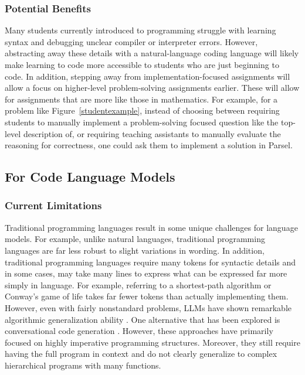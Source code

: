 \subsubsection{Potential Benefits}
Many students currently introduced to programming struggle with learning syntax and debugging unclear compiler or interpreter errors. However, abstracting away these details with a natural-language coding language will likely make learning to code more accessible to students who are just beginning to code. In addition, stepping away from implementation-focused assignments will allow a focus on higher-level problem-solving assignments earlier. These will allow for assignments that are more like those in mathematics. For example, for a problem like Figure~\ref{studentexample}, instead of choosing between requiring students to manually implement a problem-solving focused question like the top-level description of, or requiring teaching assistants to manually evaluate the reasoning for correctness, one could ask them to implement a solution in Parsel.
\subsection{For Code Language Models}
\subsubsection{Current Limitations}
Traditional programming languages result in some unique challenges for language models. For example, unlike natural languages, traditional programming languages are far less robust to slight variations in wording. In addition, traditional programming languages require many tokens for syntactic details and in some cases, may take many lines to express what can be expressed far more simply in language. For example, referring to a shortest-path algorithm or Conway's game of life takes far fewer tokens than actually implementing them. However, even with fairly nonstandard problems, LLMs have shown remarkable algorithmic generalization ability \citep{liang2022holistic,xu2022systematic,anilexploring,zhou2022teaching}. One alternative that has been explored is conversational code generation \citep{nijkamp2022conversational,yin2022natural}. However, these approaches have primarily focused on highly imperative programming structures. Moreover, they still require having the full program in context and do not clearly generalize to complex hierarchical programs with many functions. 

